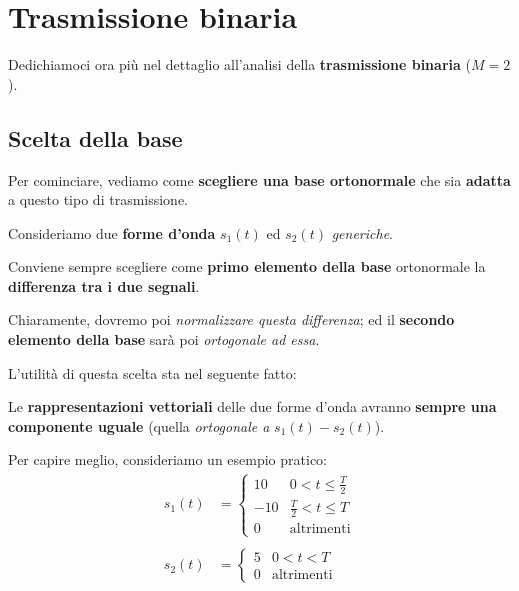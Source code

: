 \section{Trasmissione binaria}

Dedichiamoci ora più nel dettaglio all'analisi della \textbf{trasmissione binaria} ($M=2$).

\subsection{Scelta della base}

Per cominciare, vediamo come \textbf{scegliere una base ortonormale} che sia 
\textbf{adatta} a questo tipo di trasmissione.

Consideriamo due \textbf{forme d'onda} $s_{1}(t)$ ed $s_{2}(t)$ \textit{generiche}.

\begin{remark}
    Conviene sempre scegliere come \textbf{primo elemento della base}
    ortonormale la \textbf{differenza tra i due segnali}.
\end{remark}

Chiaramente, dovremo poi \textit{normalizzare questa differenza}; ed il 
\textbf{secondo elemento della base} sarà poi \textit{ortogonale ad essa}.

L'utilità di questa scelta sta nel seguente fatto:  

\begin{prop}
    Le \textbf{rappresentazioni vettoriali} delle due forme d'onda avranno 
    \textbf{sempre una componente uguale} (quella \textit{ortogonale a} $s_{1}(t) - s_{2}(t)$).
\end{prop}

Per capire meglio, consideriamo un esempio pratico:
\[
    \begin{aligned}
        s_{1}(t) &= \begin{cases}
            10 & 0 < t \le \frac{T}{2} \\ 
            -10 & \frac{T}{2} < t \le T \\ 
            0 & \text{altrimenti}
        \end{cases} \\ \\
        s_{2}(t) &= \begin{cases}
            5 & 0 < t < T \\ 
            0 & \text{altrimenti}
        \end{cases}
    \end{aligned}
\]

